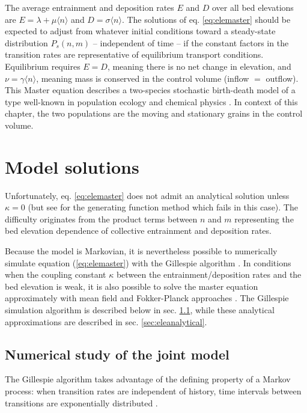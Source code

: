 The average entrainment and deposition rates $E$ and $D$ over all bed elevations are $E = \lambda +\mu \langle n \rangle$ and $D=\sigma \langle n \rangle$.
The solutions of eq. \ref{eq:elemaster} should be expected to adjust from whatever initial conditions toward a steady-state distribution $P_s(n,m)$ -- independent of time -- if the constant factors in the transition rates are representative of equilibrium transport conditions.
Equilibrium requires $E=D$, meaning there is no net change in elevation, and $\nu = \gamma \langle n \rangle$, meaning mass is conserved in the control volume (inflow $=$ outflow).
This Master equation describes a two-species stochastic birth-death model \citep{Cox1965} of a type well-known in population ecology \citep{Pielou1977, Swift2002} and chemical physics \citep{Gardiner1983}.
In context of this chapter, the two populations are the moving and stationary grains in the control volume.

\section{Model solutions}
\label{sec:elesolution}

Unfortunately, eq. \ref{eq:elemaster} does not admit an analytical solution unless $\kappa=0$ (but see \citet{Swift2002} for the generating function method which fails in this case).
The difficulty originates from the product terms between $n$ and $m$ representing the bed elevation dependence of collective entrainment and deposition rates.

Because the model is Markovian, it is nevertheless possible to numerically simulate equation (\ref{eq:elemaster}) with the Gillespie algorithm \citep{Gillespie1977, Gillespie1991, Gillespie2007}. 
In conditions when the coupling constant $\kappa$ between the entrainment/deposition rates and the bed elevation is weak, it is also possible to solve the master equation approximately with mean field and Fokker-Planck approaches \citep{Haken1978,Gardiner1983}.
The Gillespie simulation algorithm is described below in sec. \ref{sec:elenumerical}, while these analytical approximations are described in sec. \ref{sec:eleanalytical}.

\subsection{Numerical study of the joint model}
\label{sec:elenumerical}

The Gillespie algorithm takes advantage of the defining property of a Markov process: when transition rates are independent of history, time intervals between transitions are
exponentially distributed \citep{Cox1965}.

